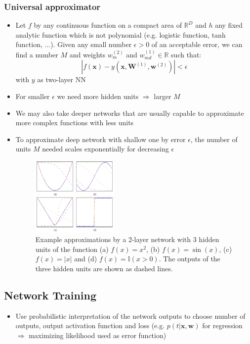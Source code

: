 \subsubsection{Universal approximator}
\begin{itemize}
	\item Let $f$ by any continuous function on a compact area of $\mathbb{R}^{D}$ and $h$ any fixed analytic function which is not polynomial (e.g. logistic function, tanh function, ...). Given any small number $\epsilon > 0$ of an acceptable error, we can find a number $M$ and weights $w_{m}^{(2)}$ and $w_{md}^{(1)}\in \mathbb{R}$ such that:
	$$\left|f(\bm{x}) - y\left(\bm{x}, \bm{W}^{(1)}, \bm{w}^{(2)}\right)\right| < \epsilon$$
	with $y$ as two-layer NN
	\item For smaller $\epsilon$ we need more hidden units $\Rightarrow$ larger $M$
	\item We may also take deeper networks that are usually capable to approximate more complex functions with less units
	\item To approximate deep network with shallow one by error $\epsilon$, the number of units $M$ needed scales exponentially for decreasing $\epsilon$
	\begin{figure}[ht]
		\centering
		\includegraphics[width=0.4\textwidth]{figures/neural_networks_universal_approximator.png}
		\caption{Example approximations by a 2-layer network with 3 hidden units of the function (a) $f(x)=x^2$, (b) $f(x)=\sin(x)$, (c) $f(x) = |x|$ and (d) $f(x)=\mathbb{I}\left(x>0\right)$. The outputs of the three hidden units are shown as dashed lines.}
		\label{img:neural_networks_universal_approximator}
	\end{figure}
\end{itemize}
\subsection{Network Training}
\begin{itemize}
	\item Use probabilistic interpretation of the network outputs to choose number of outputs, output activation function and loss (e.g. $p(t|\bm{x},\bm{w})$ for regression $\Rightarrow$ maximizing likelihood used as error function)
\end{itemize}
